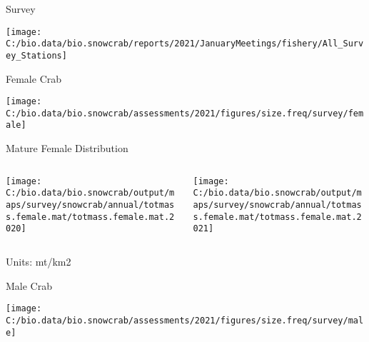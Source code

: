 \documentclass[
  ignorenonframetext,
]{beamer}
\begin{document}
\begin{frame}{Survey}
\begin{center}\texttt{[image: C:/bio.data/bio.snowcrab/reports/2021/JanuaryMeetings/fishery/All\_Survey\_Stations]} \end{center}
\end{frame}

\begin{frame}{Female Crab}
\protect\hypertarget{female-crab}{}
\begin{center}\texttt{[image: C:/bio.data/bio.snowcrab/assessments/2021/figures/size.freq/survey/female]} \end{center}
\end{frame}

\begin{frame}{Mature Female Distribution}
\protect\hypertarget{mature-female-distribution}{}
\begin{columns}[T]
\begin{column}{0.48\textwidth}
\begin{center}\texttt{[image: C:/bio.data/bio.snowcrab/output/maps/survey/snowcrab/annual/totmass.female.mat/totmass.female.mat.2020]} \end{center}
\end{column}

\begin{column}{0.48\textwidth}
\begin{center}\texttt{[image: C:/bio.data/bio.snowcrab/output/maps/survey/snowcrab/annual/totmass.female.mat/totmass.female.mat.2021]} \end{center}
\end{column}
\end{columns}

Units: mt/km2
\end{frame}

\begin{frame}{Male Crab}
\protect\hypertarget{male-crab}{}
\begin{center}\texttt{[image: C:/bio.data/bio.snowcrab/assessments/2021/figures/size.freq/survey/male]} \end{center}
\end{frame}
\end{document}
